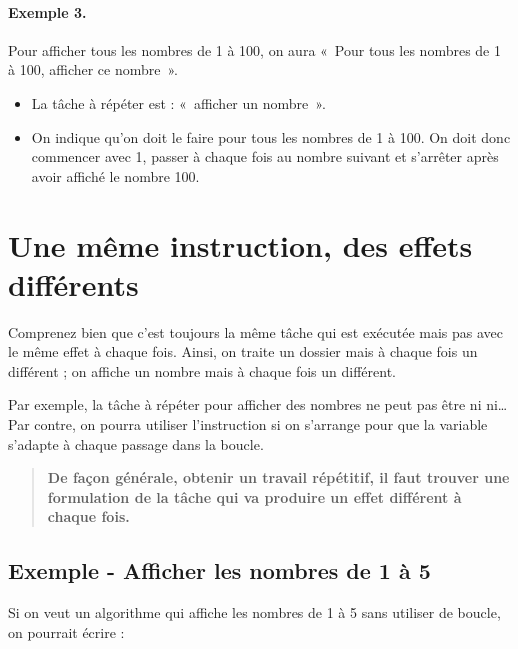 	\paragraph{Exemple 3.}
	Pour afficher tous les nombres de 1 à 100, on aura
	«~Pour tous les nombres de 1 à 100, afficher ce nombre~».
	\begin{itemize}
	\item
		La tâche à répéter est : «~afficher un nombre~».
	\item 
		On indique qu’on doit le faire pour tous les nombres de 1 à 100. 
		On doit donc commencer avec 1, 
		passer à chaque fois au nombre suivant 
		et s’arrêter après avoir affiché le nombre 100.
	\end{itemize}
		
\section{Une même instruction, des effets différents}

	Comprenez bien que c’est toujours la même tâche qui est exécutée 
	mais pas avec le même effet à chaque fois. 
	Ainsi, on traite un dossier mais à chaque fois un différent ; 
	on affiche un nombre mais à chaque fois un différent. 
	
	Par exemple, la tâche à répéter pour afficher des nombres
	ne peut pas être
	 ni  ni\dots{}
	Par contre, on pourra utiliser l'instruction
	 si on s'arrange pour que la variable
	 s'adapte à chaque passage dans la boucle.

	\begin{quote}
		\bfseries
		De façon générale,
		obtenir un travail répétitif,
		il faut trouver une formulation de la tâche
		qui va produire un effet différent à chaque fois.
	\end{quote}
	
	\subsection{Exemple - Afficher les nombres de 1 à 5}
	
		Si on veut un algorithme qui affiche les nombres de 1 à 5
		sans utiliser de boucle, on pourrait écrire :
		
		\begin{LDA}
		\end{LDA}
		
